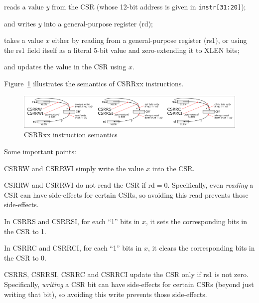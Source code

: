 \begin{tightlist}

 \item reads a value $y$ from the CSR (whose 12-bit address is given in
       \verb|instr[31:20]|);

 \item and writes $y$ into a general-purpose register (rd);

 \item takes a value $x$ either by reading from a general-purpose
       register (rs1), or using the rs1 field itself as a literal
       5-bit value and zero-extending it to XLEN bits;

 \item and updates the value in the CSR using $x$.

\end{tightlist}

Figure~\ref{Fig_CSRRxx} illustrates the semantics of CSRRxx instructions.
\begin{figure}[htbp]
  \centerline{\includegraphics[width=6in,angle=0]{Figures/Fig_CSRRxx}}
  \caption{\label{Fig_CSRRxx} CSRRxx instruction semantics}
\end{figure}
Some important points:

\begin{tightlist}

 \item CSRRW and CSRRWI simply write the value $x$ into the CSR.

 \item CSRRW and CSRRWI do not read the CSR if rd$=0$. Specifically,
       even \emph{reading} a CSR can have side-effects for certain
       CSRs, so avoiding this read prevents those side-effects.

 \item In CSRRS and CSRRSI, for each ``1'' bits in $x$, it sets the
       corresponding bits in the CSR to 1.

 \item In CSRRC and CSRRCI, for each ``1'' bits in $x$, it clears the
       corresponding bits in the CSR to 0.

 \item CSRRS, CSRRSI, CSRRC and CSRRCI update the CSR only if rs1 is
       not zero.  Specifically, \emph{writing} a CSR bit can have
       side-effects for certain CSRs (beyond just writing that bit),
       so avoiding this write prevents those side-effects.

\end{tightlist}

